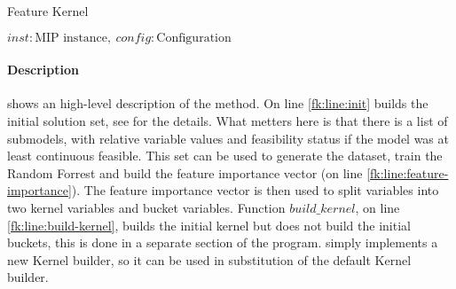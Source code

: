 \begin{algorithm}[H]
    \caption[FAKE TITLE]{Feature Kernel}\label{algo:feature-kernel}
    \begin{algorithmic}[1]
        \REQUIRE $inst: \text{MIP instance},\ config: \text{Configuration}$
         \label{fk:line:init}
         \label{fk:line:feature-importance}
         \label{fk:line:build-kernel}
    \end{algorithmic}
\end{algorithm}

\paragraph{Description}  shows an high-level description of the method. On line \ref{fk:line:init} 
 builds the initial solution set, see  for the details. What metters here is
that there is a list of submodels, with relative variable values and feasibility status if the model was at least continuous feasible. This 
set can be used to generate the dataset, train the Random Forrest and build the feature importance vector (on line \ref{fk:line:feature-importance}).
The feature importance vector is then used to split variables into two kernel variables and bucket variables. Function $build\_kernel$, on line \ref{fk:line:build-kernel},
builds the initial kernel but does not build the initial buckets, this is done in a separate section of the program.  simply implements a 
new Kernel builder, so it can be used in substitution of the default Kernel builder.



